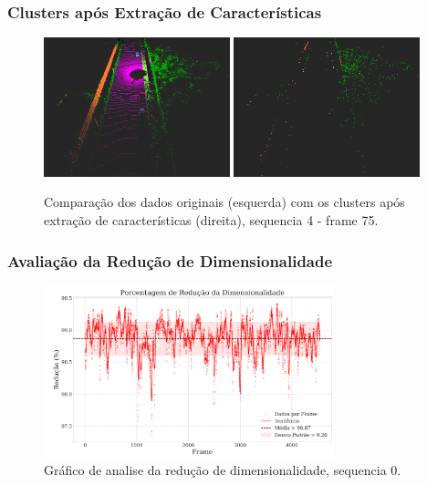\documentclass[aspectratio=169,t,xcolor=table]{beamer}
\begin{document}
\begin{frame}
    \frametitle{Clusters após Extração de Características}
    \begin{figure}
        \centering
        \includegraphics[width=0.48\textwidth]{figs/label_2_s4f75.png}
        \hspace{0.02\textwidth}
        \includegraphics[width=0.48\textwidth]{figs/cluster_2_s4f75.png}
        \caption {Comparação dos dados originais (esquerda) com os clusters
            após extração de características (direita), sequencia 4 - frame 75.}
    \end{figure}
\end{frame}

\begin{frame}
    \frametitle{Avaliação da Redução de Dimensionalidade}
    \begin{figure}
        \centering
        \includegraphics[width=0.75\textwidth]{figs/plot-1-2.png}
        \caption {Gráfico de analise da redução de dimensionalidade, sequencia 0.}
    \end{figure}
\end{frame}
\end{document}

